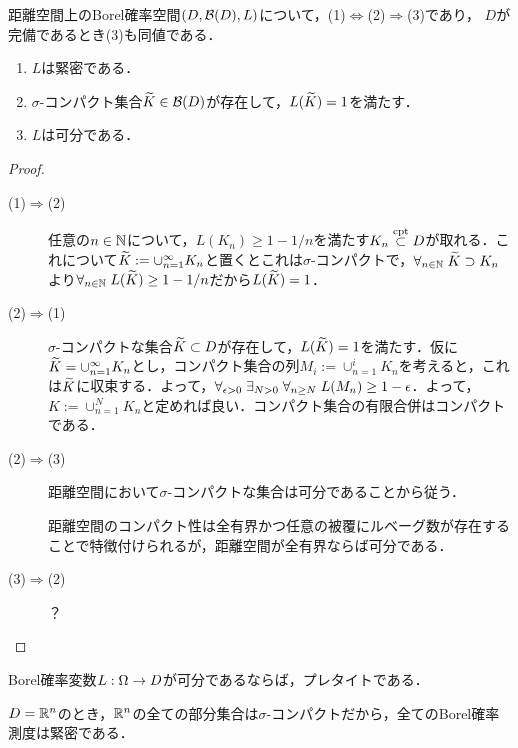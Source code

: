 \documentclass[uplatex,dvipdfmx]{jsreport}
\begin{document}
\begin{lemma}\label{lemma-separable-and-tight}
    距離空間上のBorel確率空間$(D,\mathcal{B}(D),L)$について，(1)$\Leftrightarrow$(2)$\Rightarrow$(3)であり，
    $D$が完備であるとき(3)も同値である．
    \begin{enumerate}
        \item $L$は緊密である．
        \item $\sigma$-コンパクト集合$\widetilde{K}\in\mathcal{B}(D)$が存在して，$L(\widetilde{K})=1$を満たす．
        \item $L$は可分である．
    \end{enumerate}
\end{lemma}
\begin{proof}\mbox{}
    \begin{description}
        \item[(1)$\Rightarrow$(2)] 
        任意の$n\in\mathbb{N}$について，$L(K_n)\ge 1-1/n$を満たす$K_n\overset{\textrm{cpt}}{\subset} D$が取れる．これについて$\widetilde{K}:=\cup_{n=1}^\infty K_n$と置くとこれは$\sigma$-コンパクトで，$\forall_{n\in\mathbb{N}}\;\widetilde{K}\supset K_n$より$\forall_{n\in\mathbb{N}}\;L(\widetilde{K})\ge 1-1/n$だから$L(\widetilde{K})=1$．
        \item[(2)$\Rightarrow$(1)]
        $\sigma$-コンパクトな集合$\widetilde{K}\subset D$が存在して，$L(\widetilde{K})=1$を満たす．仮に$\widetilde{K}=\cup_{n=1}^\infty K_n$とし，コンパクト集合の列$M_i:=\cup_{n=1}^iK_n$を考えると，これは$\widetilde{K}$に収束する．よって，$\forall_{\epsilon>0}\;\exists_{N>0}\;\forall_{n\ge N}\;L(M_n)\ge 1-\epsilon$．よって，$K:=\cup_{n=1}^NK_n$と定めれば良い．コンパクト集合の有限合併はコンパクトである．
        \item[(2)$\Rightarrow$(3)]
        距離空間において$\sigma$-コンパクトな集合は可分であることから従う．

        距離空間のコンパクト性は全有界かつ任意の被覆にルベーグ数が存在することで特徴付けられるが，距離空間が全有界ならば可分である．
        \item[(3)$\Rightarrow$(2)]
        ？
    \end{description}
\end{proof}

\begin{lemma}
    Borel確率変数$L:\Omega\to D$が可分であるならば，プレタイトである．
\end{lemma}

\begin{example}[標準的な確率空間の場合]
    $D=\mathbb{R}^n$のとき，$\mathbb{R}^n$の全ての部分集合は$\sigma$-コンパクトだから，全てのBorel確率測度は緊密である．
\end{example}
\end{document}
